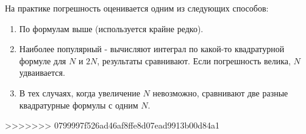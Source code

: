 \documentclass[a4paper,11pt]{article}
\begin{document}
  \begin{mainblock}
    На практике погрешность оценивается одним из следующих способов:
    \begin{enumerate}
      \item По формулам выше (используется крайне редко).
      \item Наиболее популярный - вычисляют интеграл по какой-то квадратурной формуле для $N$ и $2N$, результаты сравнивают. Если погрешность велика, $N$ удваивается.
      \item В тех случаях, когда увеличение $N$ невозможно, сравнивают две разные квадратурные формулы с одним $N$.
    \end{enumerate}
  \end{mainblock}
    
>>>>>>> 0799997f526ad46af8ffe8d07ead9913b00d84a1
\end{document}
